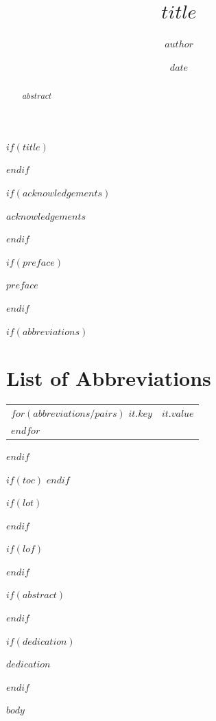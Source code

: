 \documentclass[12pt,twoside]{reedthesis}
\title{$title$}
\author{$author$}
\date{$date$}
\begin{document}
$if(title)$
  \maketitle
$endif$

\frontmatter %
\pagestyle{empty} %

$if(acknowledgements)$
  \begin{acknowledgements}
    $acknowledgements$
  \end{acknowledgements}
$endif$

$if(preface)$
  \begin{preface}
    $preface$
  \end{preface}
$endif$

$if(abbreviations)$
\chapter*{List of Abbreviations}
\begin{longtable}{p{} | p{}}
  $for(abbreviations/pairs)$
    \textbf{$it.key$} & $it.value$ \\
  $endfor$
\end{longtable}
$endif$

$if(toc)$
  \hypersetup{linkcolor=$if(toccolor)$$toccolor$$else$black$endif$}
  \setcounter{secnumdepth}{$toc-depth$}
  \setcounter{tocdepth}{$toc-depth$}
  \tableofcontents
$endif$

$if(lot)$
  \listoftables
$endif$

$if(lof)$
  \listoffigures
$endif$

$if(abstract)$
  \begin{abstract}
    $abstract$
  \end{abstract}
$endif$

$if(dedication)$
  \begin{dedication}
    $dedication$
  \end{dedication}
$endif$

\mainmatter %
\pagestyle{fancyplain} %

$body$


\end{document}
